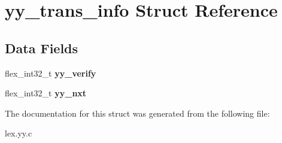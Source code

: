 \hypertarget{structyy__trans__info}{
\section{yy\_\-trans\_\-info Struct Reference}
\label{structyy__trans__info}
}
\subsection*{Data Fields}
\begin{DoxyCompactItemize}
\item 
\hypertarget{structyy__trans__info_a5faf5583708f5fa457bc1cb9bab86e38}{
flex\_\-int32\_\-t {\bfseries yy\_\-verify}}
\label{structyy__trans__info_a5faf5583708f5fa457bc1cb9bab86e38}

\item 
\hypertarget{structyy__trans__info_a51bfd9e47041873b7b8075c677d1cfe1}{
flex\_\-int32\_\-t {\bfseries yy\_\-nxt}}
\label{structyy__trans__info_a51bfd9e47041873b7b8075c677d1cfe1}

\end{DoxyCompactItemize}


The documentation for this struct was generated from the following file:\begin{DoxyCompactItemize}
\item 
lex.yy.c\end{DoxyCompactItemize}
